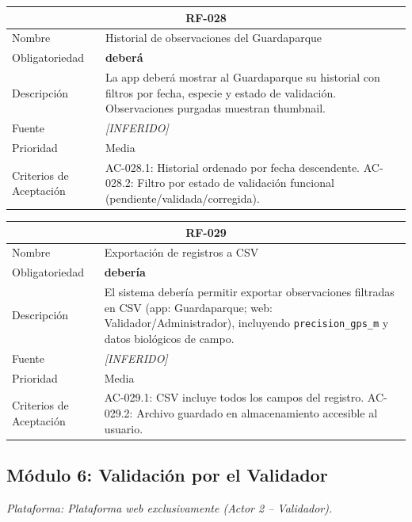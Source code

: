 \documentclass[12pt, a4paper]{article}
\newcommand{\inferido}{\textcolor{medio}{\textit{[INFERIDO]}}}
\begin{document}
\begin{longtable}{|p{3cm}|p{11.5cm}|}
\hline
\multicolumn{2}{|c|}{\textbf{RF-028}} \\
\hline
Nombre & Historial de observaciones del Guardaparque \\
\hline
Obligatoriedad & \textbf{deber\'a} \\
\hline
Descripci\'on & La app deber\'a mostrar al Guardaparque su historial con filtros por fecha, especie y estado de validaci\'on. Observaciones purgadas muestran thumbnail. \\
\hline
Fuente & \inferido{} \\
\hline
Prioridad & Media \\
\hline
Criterios de Aceptaci\'on &
AC-028.1: Historial ordenado por fecha descendente. \newline
AC-028.2: Filtro por estado de validaci\'on funcional (pendiente/validada/corregida). \\
\hline
\end{longtable}

\begin{longtable}{|p{3cm}|p{11.5cm}|}
\hline
\multicolumn{2}{|c|}{\textbf{RF-029}} \\
\hline
Nombre & Exportaci\'on de registros a CSV \\
\hline
Obligatoriedad & \textbf{deber\'ia} \\
\hline
Descripci\'on & El sistema deber\'ia permitir exportar observaciones filtradas en CSV (app: Guardaparque; web: Validador/Administrador), incluyendo \texttt{precision\_gps\_m} y datos biol\'ogicos de campo. \\
\hline
Fuente & \inferido{} \\
\hline
Prioridad & Media \\
\hline
Criterios de Aceptaci\'on &
AC-029.1: CSV incluye todos los campos del registro. \newline
AC-029.2: Archivo guardado en almacenamiento accesible al usuario. \\
\hline
\end{longtable}

\subsection{M\'odulo 6: Validaci\'on por el Validador}

\textit{Plataforma: Plataforma web exclusivamente (Actor 2 -- Validador).}
\end{document}
